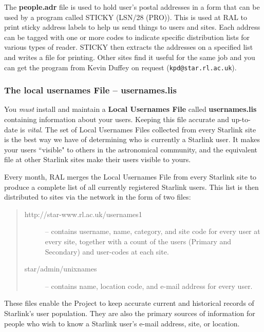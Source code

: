 The {\bf people.adr} file is used to hold user's postal addresses in a form
that can be used by a program called STICKY (LSN/28 (PRO)).
This is used at RAL to print sticky address labels to help us send things
to users and sites.
Each address can be tagged with one or more codes to indicate specific
distribution lists for various types of reader.
STICKY then extracts the addresses on a specified list and writes a file for
printing.
Other sites find it useful for the same job and you can get the program
from Kevin Duffey on request ({\tt kpd@star.rl.ac.uk}).

\subsubsection{\label{LUF}The local usernames File -- usernames.lis}

You {\em must} install and maintain a {\bf Local Usernames File}
called {\bf usernames.lis} containing information about your users.
Keeping this file accurate and up-to-date is {\em vital}.
The set of Local Usernames Files collected from every Starlink site is the
best way we have of determining who is currently a Starlink user.
It makes your users ``visible" to others in the astronomical community, and
the equivalent file at other Starlink sites make their users visible to
yours.

Every month, RAL merges the Local Usernames File from every Starlink site to
produce a complete list of all currently registered Starlink users.
This list is then distributed to sites via the network in the form of two files:

\begin{quote}
\begin{description}
\item [
 {http://star-www.rl.ac.uk/usernames1}] 
 -- contains username, name, category, and
 site code for every user at every site, together with a count of the
 users (Primary and Secondary) and user-codes at each site.
\item [star/admin/unixnames]
 -- contains name, location code, and e-mail address for every user.
\end{description}
\end{quote}

These files enable the Project to keep accurate current and historical records
of Starlink's user population.
They are also the primary sources of information for people who wish to know a
Starlink user's e-mail address, site, or location.

